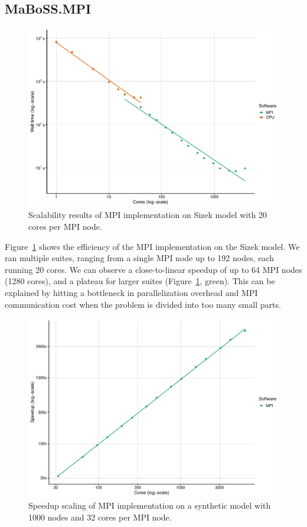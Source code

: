 \documentclass[times, twoside]{zHenriquesLab-StyleBioRxiv}
\begin{document}
\subsection*{MaBoSS.MPI}

\begin{figure}%
\centering
\includegraphics[width=.8\linewidth]{Figures/sizek_mpi.pdf}
\caption{Scalability results of MPI implementation on Sizek model with 20 cores per MPI node.}
\label{fig:sizek_results}
\end{figure}

Figure~\ref{fig:sizek_results} shows the efficiency of the MPI implementation on the Sizek model. We ran multiple suites, ranging from a single MPI node up to 192 nodes, each running 20 cores. We can observe a close-to-linear speedup of up to 64 MPI nodes (1280 cores), and a plateau for larger suites (Figure~\ref{fig:sizek_results}, green). This can be explained by hitting a bottleneck in parallelization overhead and MPI communication cost when the problem is divided into too many small parts.

\begin{figure}%
\centering
\includegraphics[width=.8\linewidth]{Figures/synth_mpi_speedup.pdf}
\caption{Speedup scaling of MPI implementation on a synthetic model with 1000 nodes and 32 cores per MPI node.}
\label{fig:synthetic_results}
\end{figure}
\end{document}
